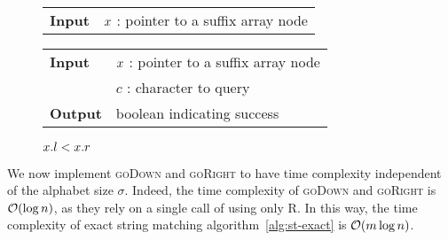 \begin{figure*}
\begin{minipage}[t]{.5\textwidth}
\begin{algorithm}[H]
\label{alg:sa-goroot}
\begin{tabular}{ll}
\textbf{Input}  & $x$ : pointer to a suffix array node\\
\end{tabular}
\begin{algorithmic}[1]
\end{algorithmic}
\end{algorithm}
\end{minipage}
\hfill
\begin{minipage}[t]{.5\textwidth}
\begin{algorithm}[H]
\label{alg:sa-godownc}
\begin{tabular}{ll}
\textbf{Input}  & $x$ : pointer to a suffix array node\\
				& $c$ : character to query\\
\textbf{Output} & boolean indicating success\\
\end{tabular}
\begin{algorithmic}[1]
	\State \Return \False
\EndIf
{}
\State \Return $x.l < x.r$
\end{algorithmic}
\end{algorithm}
\end{minipage}
\end{figure*}

We now implement \textsc{goDown} and \textsc{goRight} to have time complexity independent of the alphabet size $\sigma$.
Indeed, the time complexity of \textsc{goDown} and \textsc{goRight} is $\mathcal{O}(\log{n})$, as they rely on a single call of using only \textsc{R}.
In this way, the time complexity of exact string matching algorithm~\ref{alg:st-exact} is $\mathcal{O}(m \log{n})$.

